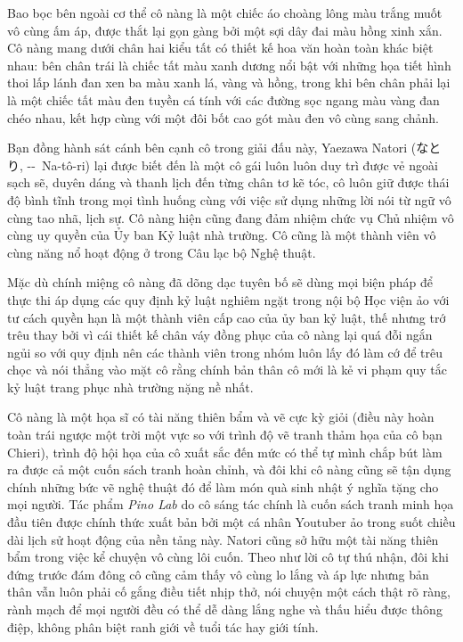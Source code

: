 \documentclass[../main.tex]{subfiles}
\begin{document}
Bao bọc bên ngoài cơ thể cô nàng là một chiếc áo choàng lông màu trắng muốt vô cùng ấm áp, được thắt lại gọn gàng bởi một sợi dây đai màu hồng xinh xắn. Cô nàng mang dưới chân hai kiểu tất có thiết kế hoa văn hoàn toàn khác biệt nhau: bên chân trái là chiếc tất màu xanh dương nổi bật với những họa tiết hình thoi lấp lánh đan xen ba màu xanh lá, vàng và hồng, trong khi bên chân phải lại là một chiếc tất màu đen tuyền cá tính với các đường sọc ngang màu vàng đan chéo nhau, kết hợp cùng với một đôi bốt cao gót màu đen vô cùng sang chảnh.

Bạn đồng hành sát cánh bên cạnh cô trong giải đấu này, Yaezawa Natori (なとり, --\ Na-tô-ri) lại được biết đến là một cô gái luôn luôn duy trì được vẻ ngoài sạch sẽ, duyên dáng và thanh lịch đến từng chân tơ kẽ tóc, cô luôn giữ được thái độ bình tĩnh trong mọi tình huống cùng với việc sử dụng những lời nói từ ngữ vô cùng tao nhã, lịch sự. Cô nàng hiện cũng đang đảm nhiệm chức vụ Chủ nhiệm vô cùng uy quyền của Ủy ban Kỷ luật nhà trường. Cô cũng là một thành viên vô cùng năng nổ hoạt động ở trong Câu lạc bộ Nghệ thuật.


Mặc dù chính miệng cô nàng đã dõng dạc tuyên bố sẽ dùng mọi biện pháp để thực thi áp dụng các quy định kỷ luật nghiêm ngặt trong nội bộ Học viện ảo với tư cách quyền hạn là một thành viên cấp cao của ủy ban kỷ luật, thế nhưng trớ trêu thay bởi vì cái thiết kế chân váy đồng phục của cô nàng lại quá đỗi ngắn ngủi so với quy định nên các thành viên trong nhóm luôn lấy đó làm cớ để trêu chọc và nói thẳng vào mặt cô rằng chính bản thân cô mới là kẻ vi phạm quy tắc kỷ luật trang phục nhà trường nặng nề nhất.

Cô nàng là một họa sĩ có tài năng thiên bẩm và vẽ cực kỳ giỏi (điều này hoàn toàn trái ngược một trời một vực so với trình độ vẽ tranh thảm họa của cô bạn Chieri), trình độ hội họa của cô xuất sắc đến mức có thể tự mình chắp bút làm ra được cả một cuốn sách tranh hoàn chỉnh, và đôi khi cô nàng cũng sẽ tận dụng chính những bức vẽ nghệ thuật đó để làm món quà sinh nhật ý nghĩa tặng cho mọi người. Tác phẩm \textit{Pino Lab} do cô sáng tác chính là cuốn sách tranh minh họa đầu tiên được chính thức xuất bản bởi một cá nhân Youtuber ảo trong suốt chiều dài lịch sử hoạt động của nền tảng này. Natori cũng sở hữu một tài năng thiên bẩm trong việc kể chuyện vô cùng lôi cuốn. Theo như lời cô tự thú nhận, đôi khi đứng trước đám đông cô cũng cảm thấy vô cùng lo lắng và áp lực nhưng bản thân vẫn luôn phải cố gắng điều tiết nhịp thở, nói chuyện một cách thật rõ ràng, rành mạch để mọi người đều có thể dễ dàng lắng nghe và thấu hiểu được thông điệp, không phân biệt ranh giới về tuổi tác hay giới tính.
\end{document}
